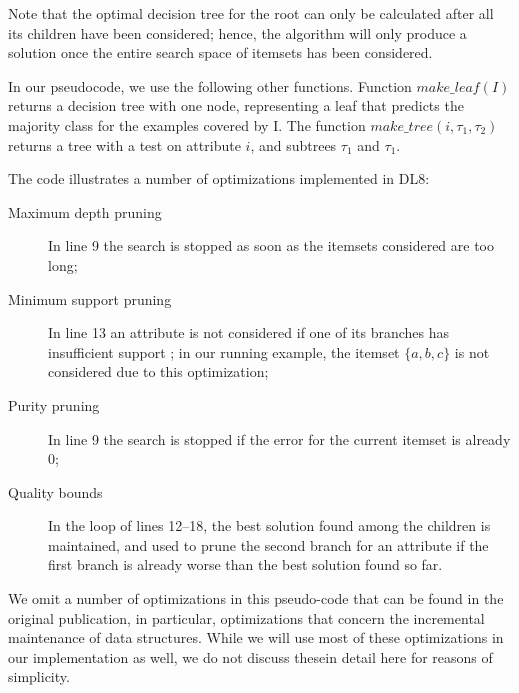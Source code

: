 Note that the optimal decision tree for the root can only be calculated after all its children have been considered; hence, the algorithm will only produce a solution once the entire search space of itemsets has been considered.

In our pseudocode, we use the following other functions. Function $make\_leaf(I)$ returns a decision tree with one node, representing a leaf that predicts the majority class for the examples covered by I. The function $make\_tree(i, \tau_1, \tau_2)$ returns a tree with a test on attribute $i$, and subtrees $\tau_1$ and $\tau_1$.

The code illustrates a number of optimizations implemented in DL8:
\begin{description}
	\item[Maximum depth pruning] In line 9 the search is stopped as soon as the itemsets considered are too long;
	\item[Minimum support pruning] In line 13 an attribute is not considered if one of its branches has insufficient support ; in our running example, the itemset $\{a, b, c\}$ is not considered due to this optimization;
	\item[Purity pruning] In line 9 the search is stopped if the error for the current itemset is already 0;
	\item[Quality bounds] In the loop of lines 12–18, the best solution found among the children is maintained, and used to prune the second branch for an attribute if the first branch is already worse than the best solution found so far.
\end{description}
 
We omit a number of optimizations in this pseudo-code that can be found in the original publication, in particular, optimizations that concern the incremental maintenance of data structures. While we will use most of these optimizations in our implementation as well, we do not discuss thesein detail here for reasons of simplicity.

